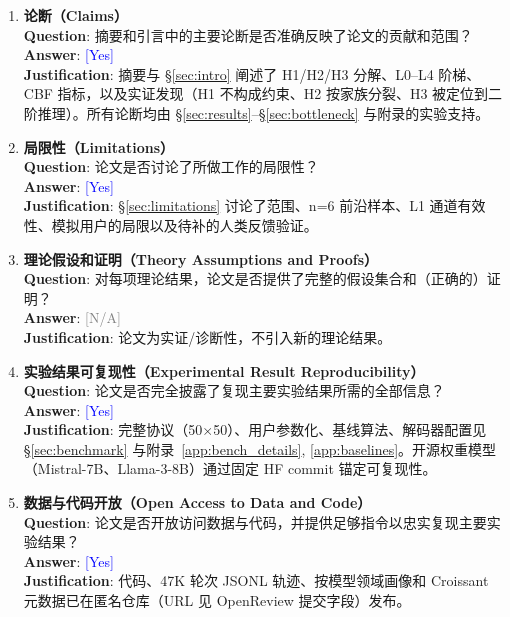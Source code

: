 \documentclass[11pt,a4paper,fontset=fandol]{ctexart}
\newcommand{\answerYes}[1][]{\textcolor{blue}{[Yes]#1}}
\newcommand{\answerNA}[1][]{\textcolor{gray}{[N/A]#1}}
\begin{document}
\begin{enumerate}
\item {\bf 论断（Claims）}\\
\textbf{Question}: 摘要和引言中的主要论断是否准确反映了论文的贡献和范围？\\
\textbf{Answer}: \answerYes{}\\
\textbf{Justification}: 摘要与 \S\ref{sec:intro} 阐述了 H1/H2/H3 分解、L0--L4 阶梯、CBF 指标，以及实证发现（H1 不构成约束、H2 按家族分裂、H3 被定位到二阶推理）。所有论断均由 \S\ref{sec:results}--\S\ref{sec:bottleneck} 与附录的实验支持。

\item {\bf 局限性（Limitations）}\\
\textbf{Question}: 论文是否讨论了所做工作的局限性？\\
\textbf{Answer}: \answerYes{}\\
\textbf{Justification}: \S\ref{sec:limitations} 讨论了范围、n=6 前沿样本、L1 通道有效性、模拟用户的局限以及待补的人类反馈验证。

\item {\bf 理论假设和证明（Theory Assumptions and Proofs）}\\
\textbf{Question}: 对每项理论结果，论文是否提供了完整的假设集合和（正确的）证明？\\
\textbf{Answer}: \answerNA{}\\
\textbf{Justification}: 论文为实证/诊断性，不引入新的理论结果。

\item {\bf 实验结果可复现性（Experimental Result Reproducibility）}\\
\textbf{Question}: 论文是否完全披露了复现主要实验结果所需的全部信息？\\
\textbf{Answer}: \answerYes{}\\
\textbf{Justification}: 完整协议（50$\times$50）、用户参数化、基线算法、解码器配置见 \S\ref{sec:benchmark} 与附录~\ref{app:bench_details}, \ref{app:baselines}。开源权重模型（Mistral-7B、Llama-3-8B）通过固定 HF commit 锚定可复现性。

\item {\bf 数据与代码开放（Open Access to Data and Code）}\\
\textbf{Question}: 论文是否开放访问数据与代码，并提供足够指令以忠实复现主要实验结果？\\
\textbf{Answer}: \answerYes{}\\
\textbf{Justification}: 代码、47K 轮次 JSONL 轨迹、按模型领域画像和 Croissant 元数据已在匿名仓库（URL 见 OpenReview 提交字段）发布。


\end{enumerate}
\end{document}
